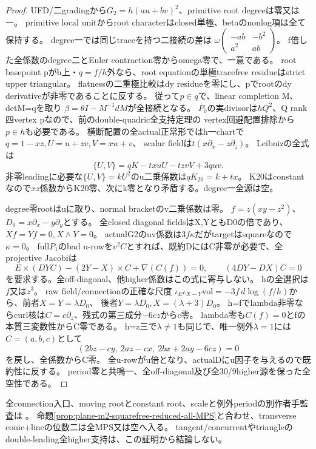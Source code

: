 \documentclass[a4paper,11pt]{ltjsarticle}
\theoremstyle{definition}
\begin{document}
\begin{proof}
UFD/二gradingから$G_2=h(au+bv)^2$、primitive root degreeは零又は一。
primitive local unitからroot characterはclosed単極、betaのnonlog項は全て保持する。
degree一では同じtraceを持つ二接続の差は
$\omega\left(\begin{smallmatrix}-ab&-b^2\\a^2&ab\end{smallmatrix}\right)$。
f倍した全係数のdegree二とEuler contraction零からomega零で、一意である。
root basepoint pがh上・$q=f/h$外なら、root equationの単極tracefree residueはstrict upper triangular。
flatnessの二重極比較はdy residueを零にし、pでrootのdy derivativeが非零であることに反する。
従って$p\in q$で、linear completion M、detM=qを取り
$\beta=\theta I-M^{-1}dM$が全接続となる。
$P_0$の実divisorは$hQ^2$、Q rank四vertex pなので、前のdouble-quadric全支持定理の
vertex回避配置排除から$p\in h$も必要である。
横断配置の全actual正常形ではh一chartで$q=1-xz,U=u+zv,V=xu+v$、
scalar fieldは$t(x\partial_x-z\partial_z)$。
Leibnizの全式は
\[
 \{U,V\}=qK-txuU-tzvV+3q uv.
\]
非零leadingに必要な$\{U,V\}=kU^2$のu二乗係数は$qK_{20}=k+tx$。
K20はconstantなので$xz$係数からK20零、次にk零となり矛盾する。degree一全源は空。

degree零rootはuに取り、normal bracketのv二乗係数は零。
$f=z(xy-z^2)$、$D_0=x\partial_x-y\partial_y$とする。
全closed diagonal fieldsはX,YともD0の倍であり、$Xf=Yf=0,X\wedge Y=0$。
actualG2のuv係数は$3f\kappa$だがtargetはsquareなので$\kappa=0$。
full$P_1$のbad u-rowを$v^2C$とすれば、既約DにはC非零が必要で、全projective Jacobiは
\[
 E\times(DY C)-(2Y-X)\times C+\nabla(C(f))=0,\qquad(4DY-DX)C=0
\]
を要求する。全off-diagonal、他higher係数はこの式に寄与しない。
hの全選択は$f$又は$z^3$。
raw field/connectionの正確な尺度
$\iota_E\iota_{X-Y}\mathrm{vol}=-3f\,d\log(f/h)$から、前者$X=Y=\lambda D_0$、
後者$Y=\lambda D_0,X=(\lambda+3)D_0$。
h=fでlambda非零ならcurl核は$C=c\partial_z$、残式の第三成分$-6cz$からc零。
lambda零も$C(f)=0$とfの本質三変数性からC零である。
h=z三で$\lambda\ne1$も同じで、唯一例外$\lambda=1$には$C=(a,b,c)$として
\[
 (2bz-cy,\ 2az-cx,\ 2bx+2ay-6cz)=0
\]
を戻し、全係数からC零。
全u-rowがu倍となり、actualDにu因子を与えるので既約性に反する。
period零と共鳴一、全off-diagonal及び全30/9higher源を保った全空性である。
\end{proof}
全connection入口、moving rootとconstant root、scaleと例外periodの別作者手監査は
。
命題\ref{prop:plane-m2-squarefree-reduced-all-MPS}と合わせ、transverse conic+lineの位数二は全MPS又は空へ入る。
tangent/concurrentやtriangleのdouble-leading全higher支持は、この証明から結論しない。
\end{document}
